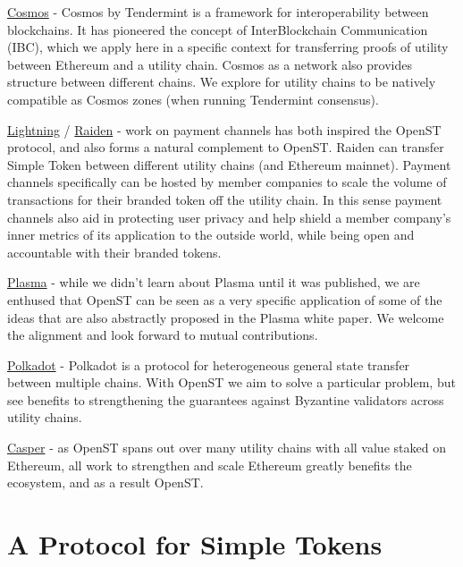 \documentclass[12pt,a4paper, twocolumn]{article}
\begin{document}
\href{https://cosmos.network/}{Cosmos} - Cosmos by Tendermint is a framework for interoperability between blockchains.  It has pioneered the concept of InterBlockchain Communication (IBC), which we apply here in a specific context for transferring proofs of utility between Ethereum and a utility chain.
Cosmos as a network also provides structure between different chains.  We explore for utility chains to be natively compatible as Cosmos zones (when running Tendermint consensus).\par
\href{https://lightning.network/}{Lightning} / \href{https://raiden.network/}{Raiden} - work on payment channels has both inspired the OpenST protocol, and also forms a natural complement to OpenST.  Raiden can transfer Simple Token between different utility chains (and Ethereum mainnet).  Payment channels specifically can be hosted by member companies to scale the volume of transactions for their branded token off the utility chain.  In this sense payment channels also aid in protecting user privacy and help shield a member company’s inner metrics of its application to the outside world, while being open and accountable with their branded tokens.\par
\href{http://plasma.io/}{Plasma} - while we didn’t learn about Plasma until it was published, we are enthused that OpenST can be seen as a very specific application of some of the ideas that are also abstractly proposed in the Plasma white paper.  We welcome the alignment and look forward to mutual contributions.\par
\href{https://polkadot.network/}{Polkadot} - Polkadot is a protocol for heterogeneous general state transfer between multiple chains.  With OpenST we aim to solve a particular problem, but see benefits to strengthening the guarantees against Byzantine validators across utility chains.\par
\href{https://github.com/ethereum/casper}{Casper} - as OpenST spans out over many utility chains with all value staked on Ethereum, all work to strengthen and scale Ethereum greatly benefits the ecosystem, and as a result OpenST.\par


\section{A Protocol for Simple Tokens}
\end{document}
